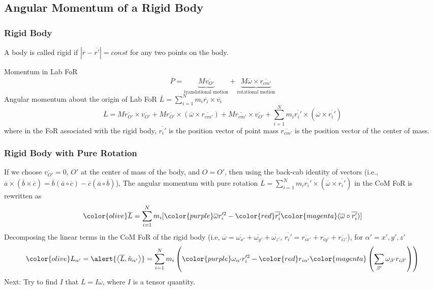 \subsection{Angular Momentum of a Rigid Body}
\begin{frame}
\frametitle{Rigid Body}
\begin{definition}
A body is called \alert{rigid} if $|\overline r-\overline {r'}|=const$ for any two points on the body.
\end{definition}
Momentum in Lab FoR
\[\overline{P}=\underbrace{M\overline{v_{O'}}}_{\text{translational motion}}+\underbrace{M\overline\omega\times\overline{r_{cm'}}}_{\text{rotational motion}}\]\pause
Angular momentum about the origin of Lab FoR \(\overline L=\sum _{i=1}^ N m_i \overline{ r_i}\times\overline{ v_i}\)
\[\overline L=M\overline{r_{O'}}\times\overline{v_{O'}}+M\overline{r_{O'}}\times(\overline{\omega}\times\overline{r_{cm'}})+M\overline{r_{cm'}}\times\overline{v_{O'}}+\sum_{i=1}^{N}m_i\overline{r_{i}'}\times(\overline\omega\times\overline{r_{i}'})\]
where in the \alert{FoR associated with the rigid body}, $\overline {r_i '}$ is the \alert{position vector} of point mass $\overline {r_{cm'}}$ is the \alert{position vector} of the center of mass.
\end{frame}
\begin{frame}
\frametitle{Rigid Body with Pure Rotation}
If we choose $\overline{v_{O'}}=0$, $O'$ at the center of mass of the body, and $O=O'$, then using the \alert{back-cab} identity of vectors (i.e., \(\overline{a}\times(\overline{b}\times\overline{c})=\overline{b} (\overline{a}\circ\overline{c})-\overline{c}(\overline{a}\circ\overline{b})\)), 
The angular momentum with \alert{pure rotation} $\overline L=\sum_{i=1}^{N}m_i\overline{r_{i}'}\times(\overline\omega\times\overline{r_{i}'})$ in the \alert{CoM FoR} is rewritten as
\[{\color{olive}\overline L}=\sum_{i=1}^{N}m_i[{\color{purple}\overline{\omega}}r_{i}'^{2}-{\color{red}\overline{r_{i}'}}{\color{magenta}(\overline\omega\circ\overline{r_{i}'})}]\]\pause
Decomposing the \alert{linear terms} in the \alert{CoM FoR} of the rigid body (i.e, $\overline\omega=\overline{\omega_{x'}}+\overline{\omega_{y'}}+\overline{\omega_{z'}}$, $\overline {r_{i}'}=\overline{r_{ix'}}+\overline{r_{iy'}}+\overline{r_{iz'}}$), for $\alpha'=x', y', z'$
\[{\color{olive}L_{\alpha'}}=\alert{\left<\overline L,\hat n_{\alpha'}\right>}=\sum_{i=1}^{N}m_{i}\left({\color{purple}\omega_{\alpha'}}r_{i}'^{2}-{\color{red}r_{i\alpha'}}{\color{magenta}\left(\sum_{\beta'}\omega_{\beta'}r_{i\beta'}\right)}\right)\]
Next: Try to find $I$ that $\overline{L}=I\overline{\omega}$, where $I$ is a tensor quantity.
\end{frame}
